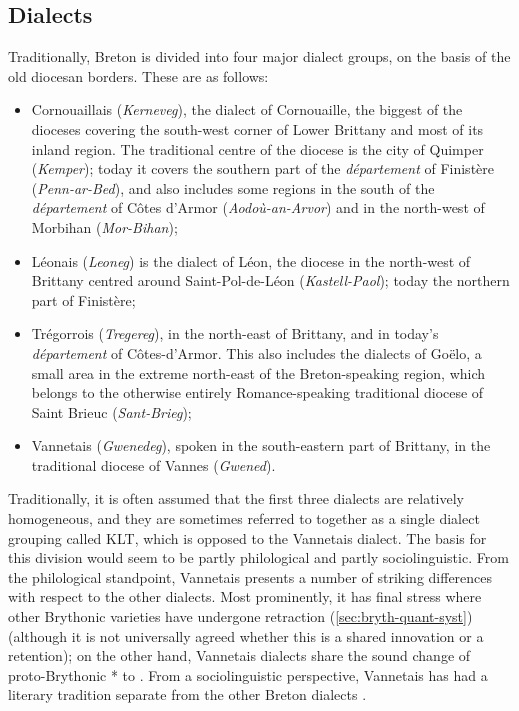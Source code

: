 \subsection{Dialects}
\label{sec:dialects}

Traditionally, Breton is divided into four major dialect groups, on the basis of the old diocesan borders. These are as follows:

\begin{itemize}
\item Cornouaillais (\emph{Kerneveg}), the dialect of Cornouaille, the biggest of the dioceses covering the south-west corner of Lower Brittany and most of its inland region. The traditional centre of the diocese is the city of Quimper (\emph{Kemper}); today it covers the southern part of the \emph{département} of Finistère (\emph{Penn-ar-Bed}), and also includes some regions in the south of the \emph{département} of Côtes d'Armor (\emph{Aodoù-an-Arvor}) and in the north-west of Morbihan (\emph{Mor-Bihan});
\item Léonais (\emph{Leoneg}) is the dialect of Léon, the diocese in the north-west of Brittany centred around Saint-Pol-de-Léon (\emph{Kastell-Paol}); today the northern part of Finistère;
\item Trégorrois (\emph{Tregereg}), in the north-east of Brittany, and in today's \emph{département} of Côtes-d'Armor. This also includes the dialects of Goëlo, a small area in the extreme north-east of the Breton-speaking region, which belongs to the otherwise entirely Romance-speaking traditional diocese of Saint Brieuc (\emph{Sant-Brieg});
\item Vannetais (\emph{Gwenedeg}), spoken in the south-eastern part of Brittany, in the traditional diocese of Vannes (\emph{Gwened}).
\end{itemize}

Traditionally, it is often assumed that the first three dialects are relatively homogeneous, and they are sometimes referred to together as a single dialect grouping called KLT, which is opposed to the Vannetais dialect. The basis for this division would seem to be partly philological and partly sociolinguistic. From the philological standpoint, Vannetais presents a number of striking differences with respect to the other dialects. Most prominently, it has final stress where other Brythonic varieties have undergone retraction (\cref{sec:bryth-quant-syst}) (although it is not universally agreed whether this is a shared innovation or a retention); on the other hand, Vannetais dialects share the sound change of proto-Brythonic * to \ipa{[h]}. From a sociolinguistic perspective, Vannetais has had a literary tradition separate from the other Breton dialects \citep[\cfm][]{guillevic02}.

